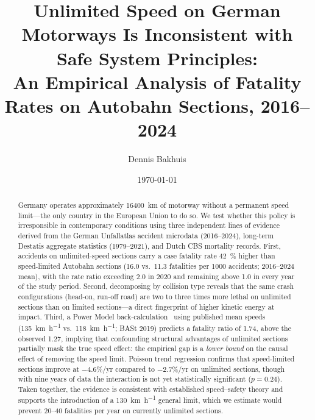 \documentclass[aps,prl,twocolumn,superscriptaddress,longbibliography]{revtex4-2}
\begin{document}
\title{Unlimited Speed on German Motorways Is Inconsistent with Safe System Principles:\\
An Empirical Analysis of Fatality Rates on Autobahn Sections, 2016--2024}

\author{Dennis Bakhuis}

\date{\today}

\begin{abstract}
Germany operates approximately \SI{16400}{\kilo\metre} of motorway without a permanent speed limit---the only country in the European Union to do so.
We test whether this policy is irresponsible in contemporary conditions using three independent lines of evidence derived from the German Unfallatlas accident microdata (2016--2024), long-term Destatis aggregate statistics (1979--2021), and Dutch CBS mortality records.
First, accidents on unlimited-speed sections carry a case fatality rate \SI{42}{\percent} higher than speed-limited Autobahn sections (16.0 vs.\ 11.3 fatalities per \num{1000} accidents; 2016--2024 mean), with the rate ratio exceeding \num{2.0} in 2020 and remaining above \num{1.0} in every year of the study period.
Second, decomposing by collision type reveals that the same crash configurations (head-on, run-off road) are two to three times more lethal on unlimited sections than on limited sections---a direct fingerprint of higher kinetic energy at impact.
Third, a Power Model back-calculation~\cite{Nilsson2004,Elvik2013} using published mean speeds (\SI{135}{\kilo\metre\per\hour} vs.\ \SI{118}{\kilo\metre\per\hour}; BASt 2019) predicts a fatality ratio of \num{1.74}, above the observed \num{1.27}, implying that confounding structural advantages of unlimited sections partially mask the true speed effect: the empirical gap is a \emph{lower bound} on the causal effect of removing the speed limit.
Poisson trend regression confirms that speed-limited sections improve at $-4.6$\%/yr compared to $-2.7$\%/yr on unlimited sections, though with nine years of data the interaction is not yet statistically significant ($p=0.24$).
Taken together, the evidence is consistent with established speed--safety theory and supports the introduction of a \SI{130}{\kilo\metre\per\hour} general limit, which we estimate would prevent 20--40 fatalities per year on currently unlimited sections.
\end{abstract}

\maketitle
\end{document}
